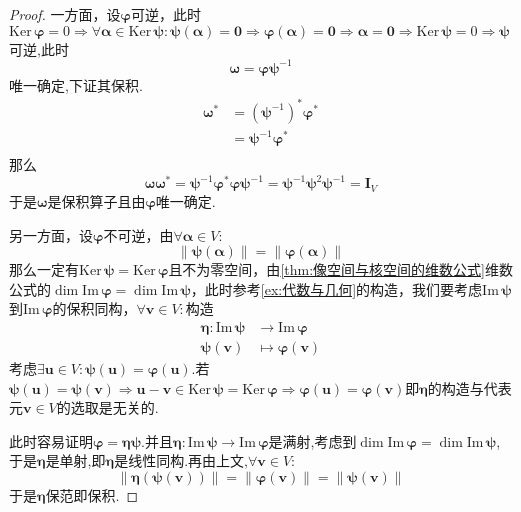 {\begin{proof}
        一方面，设$\bm{\varphi}$可逆，此时$\mathrm{Ker}\,\bm{\varphi}=0\Longrightarrow\forall\bm{\alpha}\in\mathrm{Ker}\,\bm{\psi}:\bm{\psi}\left(\bm{\alpha}\right)=\bm{0}\Longrightarrow\bm{\varphi}\left(\bm{\alpha}\right)=\bm{0}\Longrightarrow\bm{\alpha}=\bm{0}\Longrightarrow\mathrm{Ker}\,\bm{\psi}=0\Longrightarrow\bm{\psi}$可逆,此时\[
            \bm{\omega}=\bm{\varphi\psi}^{-1}
        \]唯一确定,下证其保积.\begin{align*}
            \bm{\omega}^* & =\left(\bm{\psi}^{-1}\right)^*\bm{\varphi}^* \\
                          & =\bm{\psi}^{-1}\bm{\varphi}^*                \\
        \end{align*}那么\[
            \bm{\omega\omega}^*=\bm{\psi}^{-1}\bm{\varphi}^*\bm{\varphi}\bm{\psi}^{-1}=\bm{\psi}^{-1}\bm{\psi}^2\bm{\psi}^{-1}=\bm{I}_V
        \]于是$\bm{\omega}$是保积算子且由$\bm{\varphi}$唯一确定.

        另一方面，设$\bm{\varphi}$不可逆，由$\forall\bm{\alpha}\in V:$\[
            \left\lVert\bm{\psi}\left(
            \bm{\alpha}
            \right)\right\rVert=\left\lVert\bm{\varphi}\left(
            \bm{\alpha}
            \right)\right\rVert
        \]那么一定有$\mathrm{Ker}\,\bm{\psi}=\mathrm{Ker}\,\bm{\varphi}$且不为零空间，由\cref{thm:像空间与核空间的维数公式}维数公式的$\dim \mathrm{Im}\,\bm{\varphi}=\dim \mathrm{Im}\,\bm{\psi}$，此时参考\cref{ex:代数与几何}的构造，我们要考虑$\mathrm{Im}\,\bm{\psi}$到$\mathrm{Im}\,\bm{\varphi}$的保积同构，$\forall\bm{v}\in V:$构造\begin{align*}
            \bm{\eta}:\mathrm{Im}\,\bm{\psi} & \longrightarrow\mathrm{Im}\,\bm{\varphi}   \\
            \bm{\psi}\left(\bm{v}\right)     & \longmapsto\bm{\varphi}\left(\bm{v}\right)
        \end{align*}考虑$\exists\bm{u}\in V:\bm{\psi}\left(\bm{u}\right)=\bm{\varphi}\left(\bm{u}\right)$.若$\bm{\psi}\left(\bm{u}\right)=\bm{\psi}\left(\bm{v}\right)\Longrightarrow\bm{u}-\bm{v}\in\mathrm{Ker}\,\bm{\psi}=\mathrm{Ker}\,\bm{\varphi}\Longrightarrow\bm{\varphi}\left(\bm{u}\right)=\bm{\varphi}\left(\bm{v}\right)$即$\bm{\eta}$的构造与代表元$\bm{v}\in V$的选取是无关的.

        此时容易证明$\bm{\varphi}=\bm{\eta\psi}$.并且$\bm{\eta}:\mathrm{Im}\,\bm{\psi}\longrightarrow\mathrm{Im}\,\bm{\varphi}$是满射,考虑到$\dim \mathrm{Im}\,\bm{\varphi}=\dim \mathrm{Im}\,\bm{\psi}$,于是$\bm{\eta}$是单射,即$\bm{\eta}$是线性同构.再由上文,$\forall\bm{v}\in V:$\[
            \left\lVert\bm{\eta}\left(
            \bm{\psi}\left(
                \bm{v}
                \right)
            \right)\right\rVert=\left\lVert\bm{\varphi}\left(
            \bm{v}
            \right)\right\rVert=\left\lVert\bm{\psi}\left(
            \bm{v}
            \right)\right\rVert
        \]于是$\bm{\eta}$保范即保积.


\end{proof}}
